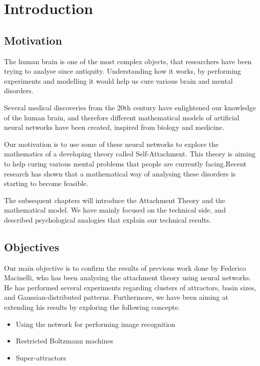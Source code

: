 \chapter{Introduction}

\section{Motivation}
The human brain is one of the most complex objects, that researchers have been trying to analyse since antiquity. Understanding how it works, by performing experiments and modelling it would help us cure various brain and mental disorders.

Several medical discoveries from the 20th century have enlightened our knowledge of the human brain, and therefore different mathematical models of artificial neural networks have been created, inspired from biology and medicine.

Our motivation is to use some of these neural networks to explore the mathematics of a developing theory called Self-Attachment. This theory is aiming to help curing various mental problems that people are currently facing.Recent research has shown that a mathematical way of analysing these disorders is starting to become feasible. \cite{net_model_neuroses}

The subsequent chapters will introduce the Attachment Theory and the mathematical model. We have mainly focused on the technical side, and described  psychological analogies that explain our technical results.

\section{Objectives}

Our main objective is to confirm the results of previous work done by Federico Macinelli, who has been analysing the attachment theory using neural networks. He has performed several experiments regarding clusters of attractors, basin sizes, and Gaussian-distributed patterns. Furthermore, we have been aiming at extending his results by exploring the following concepts:
\begin{itemize}
\item Using the network for performing image recognition
\item Restricted Boltzmann machines
\item Super-attractors
\end{itemize}


